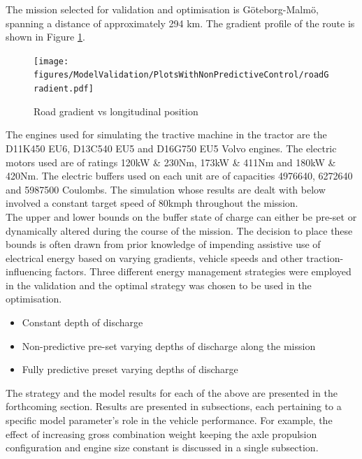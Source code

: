 \documentclass[ExampleMasters.tex]{subfiles}
\begin{document}
The mission selected for validation and optimisation is G\"oteborg-Malm\"o, spanning a distance of approximately 294 km. The gradient profile of the route is shown in Figure \ref{roadGradient}.

\begin{figure}[h!]
\centering
\texttt{[image: figures/ModelValidation/PlotsWithNonPredictiveControl/roadGradient.pdf]}
\caption{Road gradient vs longitudinal position}
\label{roadGradient}
\end{figure}

The engines used for simulating the tractive machine in the tractor are the D11K450 EU6, D13C540 EU5 and D16G750 EU5 Volvo engines. The electric motors used are of ratings 120kW \& 230Nm, 173kW \& 411Nm and  180kW \& 420Nm. The electric buffers used on each unit are of capacities 4976640, 6272640 and 5987500 Coulombs. The simulation whose results are dealt with below involved a constant target speed of 80kmph throughout the mission.\\

The upper and lower bounds on the buffer state of charge can either be pre-set or dynamically altered during the course of the mission. The decision to place these bounds is often drawn from prior knowledge of impending assistive use of electrical energy based on varying gradients, vehicle speeds and other traction-influencing factors. Three different energy management strategies were employed in the validation and the optimal strategy was chosen to be used in the optimisation.

\begin{itemize}
\item Constant depth of discharge 
\item Non-predictive pre-set varying depths of discharge along the mission
\item Fully predictive preset varying depths of discharge
\end{itemize}

The strategy and the model results for each of the above are presented in the forthcoming section. Results are presented in subsections, each pertaining to a specific model parameter's role in the vehicle performance. For example, the effect of increasing gross combination weight keeping the axle propulsion configuration and engine size constant is discussed in a single subsection.\\
\end{document}
